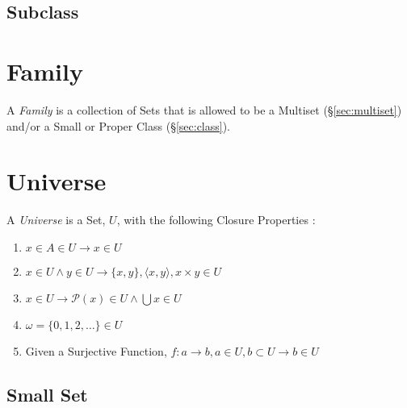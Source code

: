 \subsection{Subclass}\label{sec:subclass}



\section{Family}\label{sec:family}

A \emph{Family} is a collection of Sets that is allowed to be a
Multiset (\S\ref{sec:multiset}) and/or a Small or Proper Class
(\S\ref{sec:class}).



\section{Universe}\label{sec:universe}

A \emph{Universe} is a Set, $U$, with the following Closure Properties
\cite{maclane69}:
\begin{enumerate}
\item $x \in A \in U \rightarrow x \in U$
\item $x \in U \wedge y \in U \rightarrow \{x,y\}, \langle x,y
  \rangle, x \times y \in U$
\item $x \in U \rightarrow \mathcal{P}(x) \in U \wedge \bigcup x \in U$
\item $\omega = \{0,1,2,\ldots\} \in U$
\item Given a Surjective Function, $f : a \rightarrow b, a \in
  U, b \subset U \rightarrow b \in U$
\end{enumerate}



\subsection{Small Set}\label{sec:small_set}

